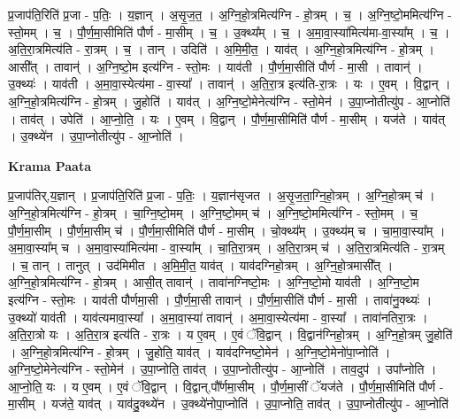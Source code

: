 \documentclass[17pt]{extarticle}
\begin{document}
प्र॒जाप॑ति॒रिति॑ प्र॒जा - प॒तिः॒ । य॒ज्ञान् । अ॒सृ॒ज॒त॒ । अ॒ग्नि॒हो॒त्रमित्य॑ग्नि - हो॒त्रम् । च॒ । अ॒ग्नि॒ष्टो॒ममित्य॑ग्नि - स्तो॒मम् । च॒ । पौ॒र्ण॒मा॒सीमिति॑ पौर्ण - मा॒सीम् । च॒ । उ॒क्थ्य᳚म् । च॒ । अ॒मा॒वा॒स्या॑मित्य॑मा-वा॒स्या᳚म् । च॒ । अ॒ति॒रा॒त्रमित्य॑ति - रा॒त्रम् । च॒ । तान् । उदिति॑ । अ॒मि॒मी॒त॒ । याव॑त् । अ॒ग्नि॒हो॒त्रमित्य॑ग्नि - हो॒त्रम् । आसी᳚त् । तावान्॑ । अ॒ग्नि॒ष्टो॒म इत्य॑ग्नि - स्तो॒मः । याव॑ती । पौ॒र्ण॒मा॒सीति॑ पौर्ण - मा॒सी । तावान्॑ । उ॒क्थ्यः॑ । याव॑ती । अ॒मा॒वा॒स्येत्य॑मा - वा॒स्या᳚ । तावान्॑ । अ॒ति॒रा॒त्र इत्य॑ति-रा॒त्रः । यः । ए॒वम् । वि॒द्वान् । अ॒ग्नि॒हो॒त्रमित्य॑ग्नि - हो॒त्रम् । जु॒होति॑ । याव॑त् । अ॒ग्नि॒ष्टो॒मेनेत्य॑ग्नि - स्तो॒मेन॑ । उ॒पा॒प्नोतीत्यु॑प - आ॒प्नोति॑ । ताव॑त् । उपेति॑ । आ॒प्नो॒ति॒ । यः । ए॒वम् । वि॒द्वान् । पौ॒र्ण॒मा॒सीमिति॑ पौर्ण - मा॒सीम् । यज॑ते । याव॑त् । उ॒क्थ्ये॑न । उ॒पा॒प्नोतीत्यु॑प - आ॒प्नोति॑ ।  \newline


\textbf{Krama Paata} \newline

प्र॒जाप॑तिर्,य॒ज्ञान् । प्र॒जाप॑ति॒रिति॑ प्र॒जा - प॒तिः॒ । य॒ज्ञान॑सृजत । अ॒सृ॒ज॒ता॒ग्नि॒हो॒त्रम् । अ॒ग्नि॒हो॒त्रम् च॑ । अ॒ग्नि॒हो॒त्रमित्य॑ग्नि - हो॒त्रम् । चा॒ग्नि॒ष्टो॒मम् । अ॒ग्नि॒ष्टो॒मम् च॑ । अ॒ग्नि॒ष्टो॒ममित्य॑ग्नि - स्तो॒मम् । च॒ पौ॒र्ण॒मा॒सीम् । पौ॒र्ण॒मा॒सीम् च॑ । पौ॒र्ण॒मा॒सीमिति॑ पौर्ण - मा॒सीम् । चो॒क्थ्य᳚म् । उ॒क्थ्य॑म् च । चा॒मा॒वा॒स्या᳚म् । अ॒मा॒वा॒स्या᳚म् च । अ॒मा॒वा॒स्या॑मित्य॑मा - वा॒स्या᳚म् । चा॒ति॒रा॒त्रम् । अ॒ति॒रा॒त्रम् च॑ । अ॒ति॒रा॒त्रमित्य॑ति - रा॒त्रम् । च॒ तान् । तानुत् । उद॑मिमीत । अ॒मि॒मी॒त॒ याव॑त् । याव॑दग्निहो॒त्रम् । अ॒ग्नि॒हो॒त्रमासी᳚त् । अ॒ग्नि॒हो॒त्रमित्य॑ग्नि - हो॒त्रम् । आसी॒त् तावान्॑ । तावा॑नग्निष्टो॒मः । अ॒ग्नि॒ष्टो॒मो याव॑ती । अ॒ग्नि॒ष्टो॒म इत्य॑ग्नि - स्तो॒मः । याव॑ती पौर्णमा॒सी । पौ॒र्ण॒मा॒सी तावान्॑ । पौ॒र्ण॒मा॒सीति॑ पौर्ण - मा॒सी । तावा॑नु॒क्थ्यः॑ । उ॒क्थ्यो॑ याव॑ती । याव॑त्यमावा॒स्या᳚ । अ॒मा॒वा॒स्या॑ तावान्॑ । अ॒मा॒वा॒स्येत्य॑मा - वा॒स्या᳚ । तावा॑नतिरा॒त्रः । अ॒ति॒रा॒त्रो यः । अ॒ति॒रा॒त्र इत्य॑ति - रा॒त्रः । य ए॒वम् । ए॒वं ॅवि॒द्वान् । वि॒द्वान॑ग्निहो॒त्रम् । अ॒ग्नि॒हो॒त्रम् जु॒होति॑ । अ॒ग्नि॒हो॒त्रमित्य॑ग्नि - हो॒त्रम् । जु॒होति॒ याव॑त् । याव॑दग्निष्टो॒मेन॑ । अ॒ग्नि॒ष्टो॒मेनो॑पा॒प्नोति॑ । अ॒ग्नि॒ष्टो॒मेनेत्य॑ग्नि - स्तो॒मेन॑ । उ॒पा॒प्नोति॒ ताव॑त् । उ॒पा॒प्नोतीत्यु॑प - आ॒प्नोति॑ । ताव॒दुप॑ । उपा᳚प्नोति । आ॒प्नो॒ति॒ यः । य ए॒वम् । ए॒वं ॅवि॒द्वान् । वि॒द्वान्,पौ᳚र्णमा॒सीम् । पौ॒र्ण॒मा॒सीं ॅयज॑ते । पौ॒र्ण॒मा॒सीमिति॑ पौर्ण - मा॒सीम् । यज॑ते॒ याव॑त् । याव॑दु॒क्थ्ये॑न । उ॒क्थ्ये॑नोपा॒प्नोति॑ । उ॒पा॒प्नोति॒ ताव॑त् । उ॒पा॒प्नोतीत्यु॑प - आ॒प्नोति॑ \newline
\end{document}
